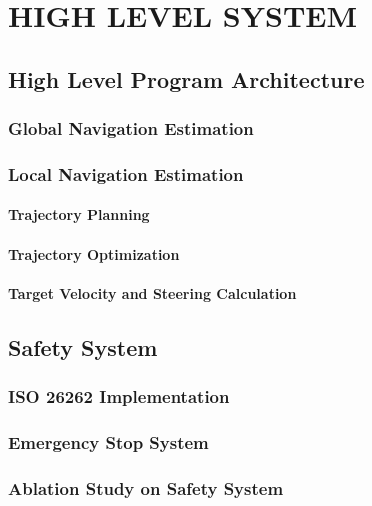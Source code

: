 \chapter{HIGH LEVEL SYSTEM}
\label{sec:chap3_metodologi4}
\section*{ } 

\section{High Level Program Architecture}
\HighLevelProgramArchitecture
\subsection{Global Navigation Estimation}
\GlobalNavigationEstimation
\subsection{Local Navigation Estimation}
\LocalNavigationEstimation
\subsubsection{Trajectory Planning}
\PathPlanning
\subsubsection{Trajectory Optimization}
\TrajectoryOptimization
\subsubsection{Target Velocity and Steering Calculation}
\TargetVelocityandSteeringCalculation

\section{Safety System}
\SafetySystem
\subsection{ISO 26262 Implementation}
\ISOImplementation
\subsection{Emergency Stop System}
\EmergencyStopSystem
\subsection{Ablation Study on Safety System}
\SafetyTests

